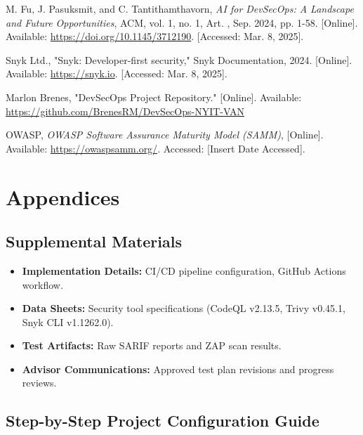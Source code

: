 \documentclass[conference]{IEEEtran}
\begin{document}
\begin{thebibliography}{9}
    M. Fu, J. Pasuksmit, and C. Tantithamthavorn, \textit{AI for DevSecOps: A Landscape and Future Opportunities}, ACM, vol. 1, no. 1, Art. , Sep. 2024, pp. 1-58. [Online]. Available: \url{https://doi.org/10.1145/3712190}. [Accessed: Mar. 8, 2025].

    Snyk Ltd., "Snyk: Developer-first security," Snyk Documentation, 2024. [Online]. Available: \url{https://snyk.io}. [Accessed: Mar. 8, 2025].

 Marlon Brenes, 
   "DevSecOps Project Repository." [Online]. Available: \url{https://github.com/BrenesRM/DevSecOps-NYIT-VAN}

    OWASP, \textit{OWASP Software Assurance Maturity Model (SAMM)}, [Online]. Available: \url{https://owaspsamm.org/}. Accessed: [Insert Date Accessed].

\end{thebibliography}

\section{Appendices}
\subsection{Supplemental Materials}
\begin{itemize}
    \item \textbf{Implementation Details:} CI/CD pipeline configuration, GitHub Actions workflow.
    \item \textbf{Data Sheets:} Security tool specifications (CodeQL v2.13.5, Trivy v0.45.1, Snyk CLI v1.1262.0).
    \item \textbf{Test Artifacts:} Raw SARIF reports and ZAP scan results.
    \item \textbf{Advisor Communications:} Approved test plan revisions and progress reviews.
\end{itemize}

\subsection{Step-by-Step Project Configuration Guide}
\label{app:config}
\end{document}
